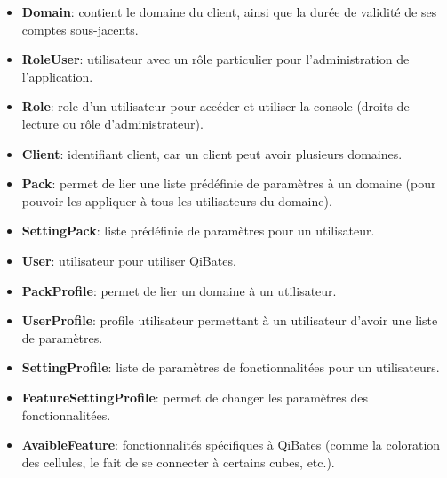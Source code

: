 \documentclass[a4paper, 11pt]{report}
\begin{document}
  \begin{itemize}
    \item \textbf{Domain}: contient le domaine du client, ainsi que la durée de validité de ses comptes sous-jacents.
    \item \textbf{RoleUser}: utilisateur avec un rôle particulier pour l'administration de l'application.
    \item \textbf{Role}: role d'un utilisateur pour accéder et utiliser la console (droits de lecture ou rôle d'administrateur).
    \item \textbf{Client}: identifiant client, car un client peut avoir plusieurs domaines.
    \item \textbf{Pack}: permet de lier une liste prédéfinie de paramètres à un domaine (pour pouvoir les appliquer à tous les utilisateurs du domaine).
    \item \textbf{SettingPack}: liste prédéfinie de paramètres pour un utilisateur.
    \item \textbf{User}: utilisateur pour utiliser QiBates.
    \item \textbf{PackProfile}: permet de lier un domaine à un utilisateur.
    \item \textbf{UserProfile}: profile utilisateur permettant à un utilisateur d'avoir une liste de paramètres.
    \item \textbf{SettingProfile}: liste de paramètres de fonctionnalitées pour un utilisateurs.
    \item \textbf{FeatureSettingProfile}: permet de changer les paramètres des fonctionnalitées.
    \item \textbf{AvaibleFeature}: fonctionnalités spécifiques à QiBates (comme la coloration des cellules, le fait de se connecter à certains cubes, etc.).
  \end{itemize}
\end{document}
